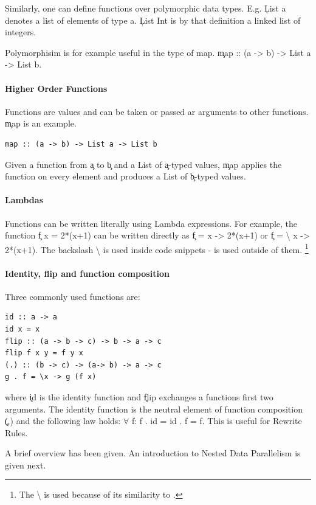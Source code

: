     Similarly, one can define functions over polymorphic data types.
    E.g. \c{List a} denotes a list of elements of type a. \c{List Int}
    is by that definition a linked list of integers.
    
    Polymorphisim is for example useful in the type of map.
    \c{map :: (a -> b) -> List a -> List b}.
  
  \paragraph{Higher Order Functions}
    Functions are values and can be taken or passed ar arguments to other functions.
    \c{map} is an example.
    \begin{lstlisting}
map :: (a -> b) -> List a -> List b
    \end{lstlisting}
    Given a function from \c{a} to \c{b} and a List of \c{a}-typed values,
    \c{map} applies the function on every element and produces a List
    of \c{b}-typed values.
    
  \paragraph{Lambdas}
    Functions can be written literally using Lambda expressions.
    For example, the function \c{f x = 2*(x+1)} can be written
    directly as \c{f = \lam x -> 2*(x+1)} or \c{f = \textbackslash{} x -> 2*(x+1)}.
    The backslash \textbackslash{} is used inside code snippets - \lam is used outside of them.
    \footnote{The \textbackslash{} is used because of its similarity to \lam.}
    
  \paragraph{Identity, flip and function composition}
    Three commonly used functions are:
    \begin{lstlisting}
id :: a -> a
id x = x
flip :: (a -> b -> c) -> b -> a -> c
flip f x y = f y x
(.) :: (b -> c) -> (a-> b) -> a -> c
g . f = \x -> g (f x)
    \end{lstlisting}
    where \c{id} is the identity function and \c{flip} exchanges a functions
    first two arguments.
    The identity function is the neutral element of function composition \c{(.)}
    and the following law holds:
     \c{\textrm{$\forall$} f: f . id = id . f = f}. This is useful for Rewrite Rules.


  \p
  A brief overview has been given. An introduction to Nested Data Parallelism is given next.



